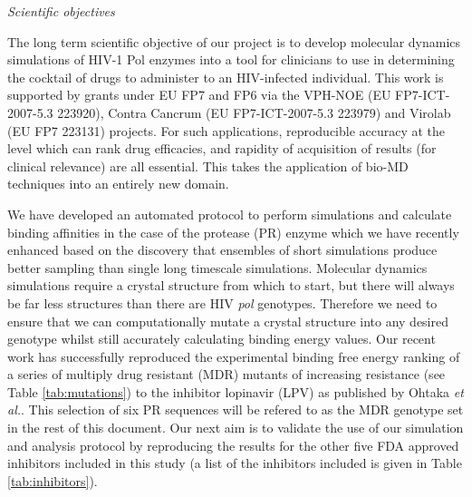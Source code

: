 \begin{compactenum}[a)]

\item \emph{Scientific objectives} 

The long term scientific objective of our project is to develop molecular dynamics simulations of HIV-1 Pol enzymes into a tool for clinicians to use in determining the cocktail of drugs to administer to an HIV-infected individual. This work is supported by grants under EU FP7 and FP6 via the VPH-NOE (EU FP7-ICT-2007-5.3 223920), Contra Cancrum (EU FP7-ICT-2007-5.3 223979) and Virolab (EU FP7 223131) projects. For such applications, reproducible accuracy at the level which can rank drug efficacies, and rapidity of acquisition of results (for clinical relevance) are all essential. This takes the application of bio-MD techniques into an entirely new domain.

We have developed an automated protocol to perform simulations and calculate binding affinities in the case of the protease (PR) enzyme\cite{Stoica2008} which we have recently enhanced based on the discovery that ensembles of short simulations produce better sampling than single long timescale simulations\cite{Genheden2009,Sadiq2010}. Molecular dynamics simulations require a crystal structure from which to start, but there will always be far less structures than there are HIV \emph{pol} genotypes. Therefore we need to ensure that we can computationally mutate a crystal structure into any desired 
genotype whilst still accurately calculating binding energy values. Our recent work has successfully reproduced the experimental binding free energy ranking of a series of multiply drug resistant (MDR) mutants of increasing resistance (see Table \ref{tab:mutations}) to the inhibitor lopinavir (LPV) as published by Ohtaka \emph{et al.}\cite{Ohtaka2003}. This selection of six PR sequences will be refered to as the MDR genotype set in the rest of this document. Our next aim is to validate the use of our simulation and analysis protocol by reproducing the results for the other five FDA approved inhibitors included in this study (a list of the inhibitors included is given in Table \ref{tab:inhibitors}).


\end{compactenum}
